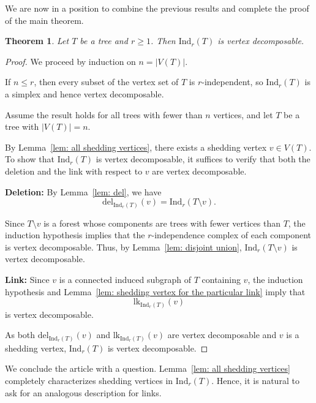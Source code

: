 \documentclass[12pt,reqno]{amsart}
\newtheorem{theorem}{Theorem}[section]
\theoremstyle{definition}
\def\Ind{\mathrm{Ind}}
\def\del{\mathrm{del}}
\def\lk{\mathrm{lk}}
\begin{document}
We are now in a position to combine the previous results and complete the proof of the main theorem.

\begin{theorem}\label{them: V.D for tree}
Let $T$ be a tree and $r \ge 1$. Then $\Ind_r(T)$ is vertex decomposable.
\end{theorem}

\begin{proof}
We proceed by induction on $n = |V(T)|$.

If $n \le r$, then every subset of the vertex set of $T$ is $r$-independent, so $\Ind_r(T)$ is a simplex and hence vertex decomposable.

Assume the result holds for all trees with fewer than $n$ vertices, and let $T$ be a tree with $|V(T)| = n$.

By Lemma~\ref{lem: all shedding vertices}, there exists a shedding vertex $v \in V(T)$. To show that $\Ind_r(T)$ is vertex decomposable, it suffices to verify that both the deletion and the link with respect to $v$ are vertex decomposable.

\medskip
\noindent
\textbf{Deletion:}
By Lemma~\ref{lem: del}, we have
\[
\del_{\Ind_r(T)}(v) = \Ind_r(T \setminus v).
\]

Since $T \setminus v$ is a forest whose components are trees with fewer vertices than $T$, the induction hypothesis implies that the $r$-independence complex of each component is vertex decomposable. Thus, by Lemma~\ref{lem: disjoint union}, $\Ind_r(T \setminus v)$ is vertex decomposable.


\medskip
\noindent
\textbf{Link:} Since $v$ is a connected induced subgraph of $T$ containing $v$, the induction hypothesis and Lemma~\ref{lem: shedding vertex for the particular link} imply that
\[
\lk_{\Ind_r(T)}(v)
\]
is vertex decomposable.

\medskip
\noindent
As both $\del_{\Ind_r(T)}(v)$ and $\lk_{\Ind_r(T)}(v)$ are vertex decomposable and $v$ is a shedding vertex, $\Ind_r(T)$ is vertex decomposable.
\end{proof}

We conclude the article with a question. 
Lemma~\ref{lem: all shedding vertices} completely characterizes shedding vertices in $\Ind_r(T)$. 
Hence, it is natural to ask for an analogous description for links.
\end{document}
